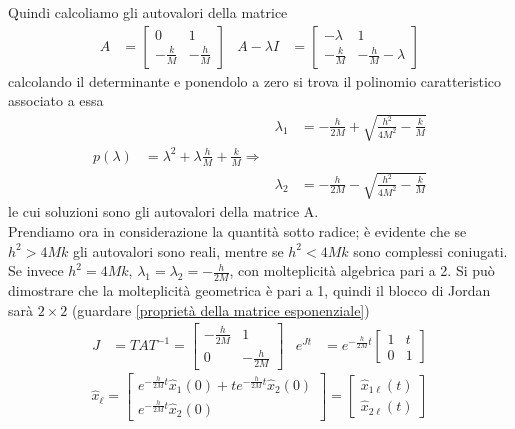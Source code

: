 \documentclass{article}
\numberwithin{equation}{subsection}
\begin{document}
Quindi calcoliamo gli autovalori della matrice
\begin{align*}
    A &= 
    \begin{bmatrix}
        0 & 1\\
        - \frac{k}{M} & -\frac{h}{M}
    \end{bmatrix}
    &
    A - \lambda I &= 
    \begin{bmatrix}
        -\lambda & 1\\
        - \frac{k}{M} & -\frac{h}{M} - \lambda
    \end{bmatrix}
\end{align*}
calcolando il determinante e ponendolo a zero si trova il polinomio caratteristico associato a essa
\begin{align*}
    & & \lambda_1 &= - \frac{h}{2M} + \sqrt{\frac{h^2}{4M^2} - \frac{k}{M}}\\
    p(\lambda) &= \lambda^2 + \lambda \frac{h}{M} + \frac{k}{M} \Longrightarrow\\
    & & \lambda_2 &= - \frac{h}{2M} - \sqrt{\frac{h^2}{4M^2} - \frac{k}{M}}
\end{align*}
le cui soluzioni sono gli autovalori della matrice A.\\
Prendiamo ora in considerazione la quantità sotto radice; è evidente che se $h^2 > 4Mk$ gli autovalori sono reali, mentre se $h^2 < 4Mk$ sono complessi coniugati.
\vspace*{0.2cm}\\
Se invece $h^2 = 4Mk$, $\lambda_1 = \lambda_2 = -\frac{h}{2M}$, con molteplicità algebrica pari a 2. Si può dimostrare che la molteplicità geometrica è pari a 1, quindi il blocco di Jordan sarà $2 \times 2$ (guardare \ref{proprietà della matrice esponenziale})
\begin{align*}
    J &= TAT^{-1} = 
    \begin{bmatrix}
        - \frac{h}{2M} & 1\\
        0 & - \frac{h}{2M}
    \end{bmatrix}
    &
    e^{Jt} &= e^{- \frac{h}{2M}t}
    \begin{bmatrix}
        1 & t\\
        0 & 1
    \end{bmatrix}
\end{align*}
\begin{equation}
    \hat x_\ell = 
    \begin{bmatrix}
        e^{- \frac{h}{2M}t} \hat x_1(0) + t e^{- \frac{h}{2M}t} \hat x_2(0) \\
        e^{- \frac{h}{2M}t} \hat x_2(0)
    \end{bmatrix}
    =
    \begin{bmatrix}
        \hat x_{1 \ell}(t)\\
        \hat x_{2 \ell}(t)
    \end{bmatrix}
\end{equation}
\end{document}
